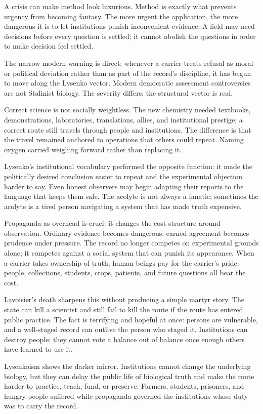A crisis can make method look luxurious. Method is exactly what prevents
urgency from becoming fantasy. The more urgent the application, the
more dangerous it is to let institutions punish inconvenient evidence.
A field may need decisions before every question is settled; it cannot
abolish the questions in order to make decision feel settled.

The narrow modern warning is direct: whenever a carrier treats refusal
as moral or political deviation rather than as part of the record's
discipline, it has begun to move along the Lysenko vector. Modern
democratic assessment controversies are not Stalinist biology. The
severity differs; the structural vector is real.

Correct science is not socially weightless. The new chemistry needed
textbooks, demonstrations, laboratories, translations, allies, and
institutional prestige; a correct route still travels through people
and institutions. The difference is that the travel remained anchored
to operations that others could repeat. Naming oxygen carried weighing
forward rather than replacing it.

Lysenko's institutional vocabulary performed the opposite function: it
made the politically desired conclusion easier to repeat and the
experimental objection harder to say. Even honest observers may begin
adapting their reports to the language that keeps them safe. The
acolyte is not always a fanatic; sometimes the acolyte is a tired
person navigating a system that has made truth expensive.

Propaganda as overhead is cruel: it changes the cost structure around
observation. Ordinary evidence becomes dangerous; earned agreement
becomes prudence under pressure. The record no longer competes on
experimental grounds alone; it competes against a social system that
can punish its appearance. When a carrier takes ownership of truth,
human beings pay for the carrier's pride: people, collections,
students, crops, patients, and future questions all bear the cost.

Lavoisier's death sharpens this without producing a simple martyr
story. The state can kill a scientist and still fail to kill the route
if the route has entered public practice. The fact is terrifying and
hopeful at once: persons are vulnerable, and a well-staged record can
outlive the person who staged it. Institutions can destroy people; they
cannot vote a balance out of balance once enough others have learned to
use it.

Lysenkoism shows the darker mirror. Institutions cannot change the
underlying biology, but they can delay the public life of biological
truth and make the route harder to practice, teach, fund, or preserve.
Farmers, students, prisoners, and hungry people suffered while
propaganda governed the institutions whose duty was to carry the record.

